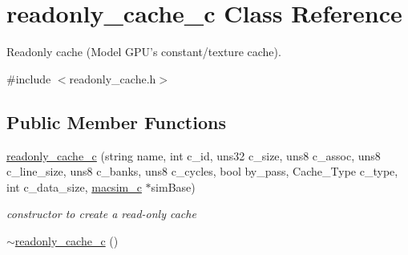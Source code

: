\hypertarget{classreadonly__cache__c}{
\section{readonly\_\-cache\_\-c Class Reference}
\label{classreadonly__cache__c}
}


Readonly cache (Model GPU's constant/texture cache).  




{\ttfamily \#include $<$readonly\_\-cache.h$>$}

\subsection*{Public Member Functions}
\begin{DoxyCompactItemize}
\item 
\hypertarget{classreadonly__cache__c_aeeec3807fcbdf17fd773bbf1969e3d34}{
\hyperlink{classreadonly__cache__c_aeeec3807fcbdf17fd773bbf1969e3d34}{readonly\_\-cache\_\-c} (string name, int c\_\-id, uns32 c\_\-size, uns8 c\_\-assoc, uns8 c\_\-line\_\-size, uns8 c\_\-banks, uns8 c\_\-cycles, bool by\_\-pass, Cache\_\-Type c\_\-type, int c\_\-data\_\-size, \hyperlink{classmacsim__c}{macsim\_\-c} $\ast$simBase)}
\label{classreadonly__cache__c_aeeec3807fcbdf17fd773bbf1969e3d34}

\begin{DoxyCompactList}\small\item\em constructor to create a read-\/only cache \item\end{DoxyCompactList}\item 
\hypertarget{classreadonly__cache__c_a047b835398739dad94617f3b054065bf}{
\hyperlink{classreadonly__cache__c_a047b835398739dad94617f3b054065bf}{$\sim$readonly\_\-cache\_\-c} ()}
\label{classreadonly__cache__c_a047b835398739dad94617f3b054065bf}


\end{DoxyCompactItemize}
